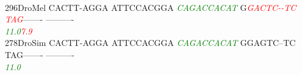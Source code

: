 \documentclass[11pt,twoside,reqno,a4paper]{article}
\begin{document}
{\\
296\hspace*{1\charwidth}DroMel	CACTT-AGGA	ATTCCACGGA	\textit{\textcolor{Green}{C}}\textit{\textcolor{Green}{A}}\textit{\textcolor{Green}{G}}\textit{\textcolor{Green}{A}}\textit{\textcolor{Green}{C}}\textit{\textcolor{Green}{C}}\textit{\textcolor{Green}{A}}\textit{\textcolor{Green}{C}}\textit{\textcolor{Green}{A}}\textit{\textcolor{Green}{T}}	G\textit{\textcolor{Red}{G}}\textit{\textcolor{Red}{A}}\textit{\textcolor{Red}{C}}\textit{\textcolor{Red}{T}}\textit{\textcolor{Red}{C}}\textit{\textcolor{Red}{-}}\textit{\textcolor{Red}{-}}\textit{\textcolor{Red}{T}}\textit{\textcolor{Red}{C}}	\textit{\textcolor{Red}{T}}\textit{\textcolor{Red}{A}}\textit{\textcolor{Red}{G}}-------	----------	\\
\hspace*{4\charwidth}\hspace*{7\charwidth}\hspace*{1\charwidth}\hspace*{1\charwidth}\hspace*{20\charwidth}\textit{\textcolor{Green}{11.0}}\hspace*{1\charwidth}\hspace*{7\charwidth}\textit{\textcolor{Red}{7.9}}\hspace*{1\charwidth}\hspace*{1\charwidth}\hspace*{1\charwidth}\\
278\hspace*{1\charwidth}DroSim	CACTT-AGGA	ATTCCACGGA	\textit{\textcolor{Green}{C}}\textit{\textcolor{Green}{A}}\textit{\textcolor{Green}{G}}\textit{\textcolor{Green}{A}}\textit{\textcolor{Green}{C}}\textit{\textcolor{Green}{C}}\textit{\textcolor{Green}{A}}\textit{\textcolor{Green}{C}}\textit{\textcolor{Green}{A}}\textit{\textcolor{Green}{T}}	GGAGTC--TC	TAG-------	----------	\\
\hspace*{4\charwidth}\hspace*{7\charwidth}\hspace*{1\charwidth}\hspace*{1\charwidth}\hspace*{20\charwidth}\textit{\textcolor{Green}{11.0}}\hspace*{1\charwidth}\hspace*{1\charwidth}\hspace*{1\charwidth}\hspace*{1\charwidth}\\
}
\end{document}
